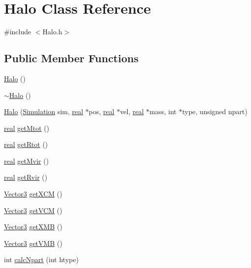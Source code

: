 \section{Halo Class Reference}
\label{classHalo}


{\ttfamily \#include $<$Halo.h$>$}

\subsection*{Public Member Functions}
\begin{DoxyCompactItemize}
\item 
\hyperlink{classHalo_aace30bc2c9c3b1fe479550ec854f76b2}{Halo} ()
\item 
\hyperlink{classHalo_af14b14344802b6c82d9099f49b74b004}{$\sim$Halo} ()
\item 
\hyperlink{classHalo_abfcf58fb0b55aea69bbc18f0053f4bce}{Halo} (\hyperlink{classSimulation}{Simulation} sim, \hyperlink{Global_8h_a031f8951175b43076c2084a6c2173410}{real} $\ast$pos, \hyperlink{Global_8h_a031f8951175b43076c2084a6c2173410}{real} $\ast$vel, \hyperlink{Global_8h_a031f8951175b43076c2084a6c2173410}{real} $\ast$mass, int $\ast$type, unsigned npart)
\item 
\hyperlink{Global_8h_a031f8951175b43076c2084a6c2173410}{real} \hyperlink{classHalo_aace4451e5de161d6aa8707c5ee394f21}{getMtot} ()
\item 
\hyperlink{Global_8h_a031f8951175b43076c2084a6c2173410}{real} \hyperlink{classHalo_acc4fef152c532108d09973848f460c14}{getRtot} ()
\item 
\hyperlink{Global_8h_a031f8951175b43076c2084a6c2173410}{real} \hyperlink{classHalo_a4800137e9fe233e1cdb439e34b4dc723}{getMvir} ()
\item 
\hyperlink{Global_8h_a031f8951175b43076c2084a6c2173410}{real} \hyperlink{classHalo_ab5a35a75689e2bc0ddb683e83e8be49b}{getRvir} ()
\item 
\hyperlink{classVector3}{Vector3} \hyperlink{classHalo_aaa531bfdbdff8f5f6aea7f82e260fcaf}{getXCM} ()
\item 
\hyperlink{classVector3}{Vector3} \hyperlink{classHalo_a2783350477ec2fede9d9e2fb891d35fc}{getVCM} ()
\item 
\hyperlink{classVector3}{Vector3} \hyperlink{classHalo_a7f3f8b61f172eb1af5a57721a8a9abae}{getXMB} ()
\item 
\hyperlink{classVector3}{Vector3} \hyperlink{classHalo_a77899ddb0f14ad408d0ca3372e0ca50d}{getVMB} ()
\item 
int \hyperlink{classHalo_a5d30d6d529d114af2c3a1710d95e6014}{calcNpart} (int htype)

\end{DoxyCompactItemize}
